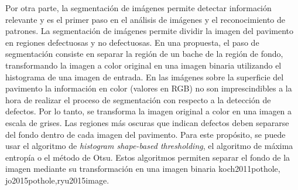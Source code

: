 		Por otra parte, la segmentación de imágenes permite detectar información relevante y es el primer paso en el análisis de imágenes y el 
		reconocimiento de patrones.
		La segmentación de imágenes permite  dividir la imagen del pavimento en regiones defectuosas y no defectuosas.
		En una propuesta, el paso de segmentación consiste en separar la región de un bache de la región de fondo, transformando la imagen a color original 
		en una imagen binaria utilizando el histograma de una imagen de entrada.
		En las imágenes sobre la superficie del pavimento la información en color (valores en RGB) no son imprescindibles a la hora de realizar 
		el proceso de segmentación con respecto a la detección de defectos. Por lo tanto, se  transforma la imagen original a color en una 
		imagen a escala de grises. Las regiones más oscuras que indican defectos deben separarse del fondo 
		dentro de cada imagen del pavimento. Para este propósito, se puede usar el algoritmo de \emph{histogram shape-based
		thresholding}, el algoritmo de máxima entropía o el método de Otsu.
		Estos algoritmos permiten separar el fondo de la imagen mediante su transformación en una imagen binaria\brackcite
		{koch2011pothole, jo2015pothole,ryu2015image}. 


